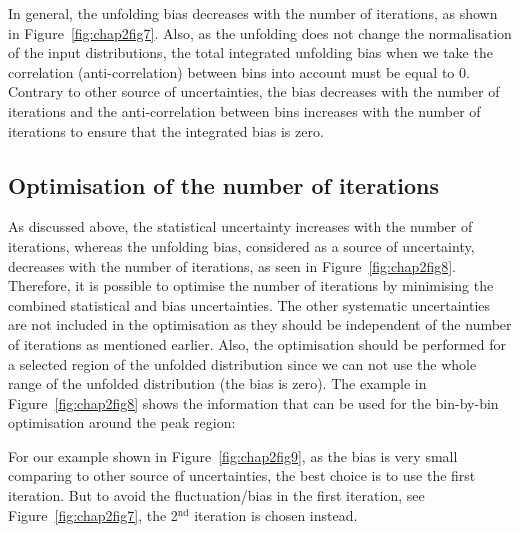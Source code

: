 In general, the unfolding bias decreases with the number of iterations, as shown in Figure~\ref{fig:chap2fig7}. Also, as the unfolding does not change the normalisation of the input distributions, the total integrated unfolding bias when we take the correlation (anti-correlation) between bins into account must be equal to 0. Contrary to other source of uncertainties, the bias decreases with the number of iterations and the anti-correlation between bins increases with the number of iterations to ensure that the integrated bias is zero.


\subsection{Optimisation of the number of iterations}
\label{optimisation}

As discussed above, the statistical uncertainty increases with the number of iterations, whereas the unfolding bias, considered as a source of uncertainty, decreases with the number of iterations, as seen in Figure~\ref{fig:chap2fig8}. 
Therefore, it is possible to optimise the number of iterations by minimising the combined statistical and bias uncertainties.
The other systematic uncertainties are not included in the optimisation as they should be independent of the number of iterations as mentioned earlier. Also, the optimisation should be performed for a selected region of the unfolded distribution since we can not use the whole range of the unfolded distribution (the bias is zero). The example in Figure~\ref{fig:chap2fig8} shows the information that can be used for the bin-by-bin optimisation around the peak region:



\noindent For our example shown in Figure~\ref{fig:chap2fig9}, as the bias is very small comparing to other source of uncertainties, the best choice is to use the first iteration. But to avoid the fluctuation/bias in the first iteration, see Figure~\ref{fig:chap2fig7}, the 2$^\mathrm{nd}$ iteration is chosen instead.
%

























